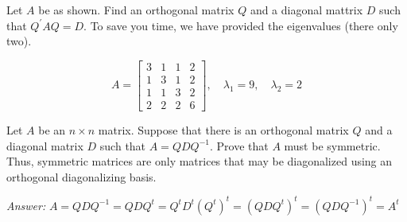 \documentclass[letterpaper]{article}
\newcommand{\ans}{\textit{Answer: }}
\newenvironment{question}[2][Question]{\begin{trivlist}
\item[\hskip \labelsep {\bfseries #1}\hskip \labelsep {\bfseries #2.}]}{\end{trivlist}}
\begin{document}
\begin{question}{6.115}
  Let $A$ be as shown. Find an orthogonal matrix $Q$ and a diagonal mattrix $D$
  such that $Q^{\prime} A Q=D .$ To save you time, we have provided the eigenvalues
  (there only two).

  $$
  A=\left[ \begin{array}{llll}{3} & {1} & {1} & {2} \\ {1} & {3} & {1} & {2} \\ {1} & {1} & {3} & {2} \\ {2} & {2} & {2} & {6}\end{array}\right], \quad \lambda_{1}=9, \quad \lambda_{2}=2
  $$
\end{question}

\begin{question}{6.122}
  Let $A$ be an $n \times n$ matrix. Suppose that there is an orthogonal matrix $Q$ and
  a diagonal matrix $D$ such that $A=Q D Q^{-1} .$ Prove that $A$ must be symmetric.
  Thus, symmetric matrices are only matrices that may be diagonalized
  using an orthogonal diagonalizing basis.
  
  \ans $A = QDQ^{-1} = QDQ^t = Q^tD^t(Q^t)^t = (QDQ^t)^t = (QDQ^{-1})^t = A^t$
\end{question}
\end{document}
